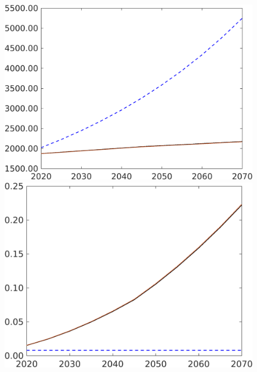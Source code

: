 \begin{figure}[h!!]
\begin{minipage}[]{0.32\textwidth}
	\end{minipage}
	\begin{minipage}[]{0.32\textwidth}
		\includegraphics[width=1\textwidth]{../../codding_model/own_basedOnFried/optimalPol_190722_tidiedUp/figures/all_10Aout22/CountMod1_target_Af_regime3_spillover0_sep1_extern0_etaa0.79_lgd0.png}
	\end{minipage}
	\begin{minipage}[]{0.32\textwidth}
		\includegraphics[width=1\textwidth]{../../codding_model/own_basedOnFried/optimalPol_190722_tidiedUp/figures/all_10Aout22/CountMod1_target_AgAf_regime3_spillover0_sep1_extern0_etaa0.79_lgd0.png}
	\end{minipage}
\end{figure}



